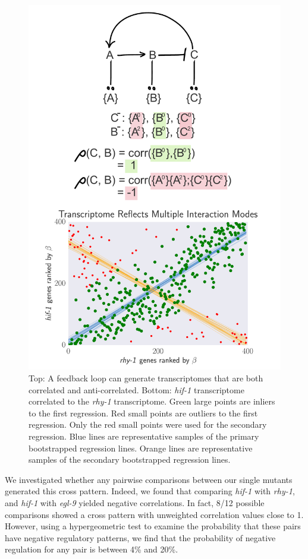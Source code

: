 \documentclass[9pt,twocolumn,twoside]{pnas-new}
\newcommand{\egl}{\emph{egl-9}}
\newcommand{\rhy}{\emph{rhy-1}}
\newcommand{\hif}{\emph{hif-1}}
\begin{document}
\begin{figure}[tbhp]
\centering
\includegraphics[width=.74\linewidth]{figs/correlative_genetics2.pdf}
\caption{Top: A feedback loop can generate transcriptomes that are both correlated and anti-correlated. Bottom: \hif{} transcriptome correlated to the \rhy{} transcriptome. Green large points are inliers to the first regression. Red small points are outliers to the first regression. Only the red small points were used for the secondary regression. Blue lines are representative samples of the primary bootstrapped regression lines. Orange lines are representative samples of the secondary bootstrapped regression lines.}
\label{fig:xpattern}
\end{figure}
We investigated whether any pairwise comparisons between our single mutants generated this cross pattern. Indeed, we found that comparing \hif{} with \rhy{}, and \hif{} with \egl{} yielded negative correlations. In fact, 8/12 possible comparisons showed a cross pattern with unweighted correlation values close to 1. However, using a hypergeometric test to examine the probability that these pairs have negative regulatory patterns, we find that the probability of negative regulation for any pair is between 4\% and 20\%.
\end{document}
